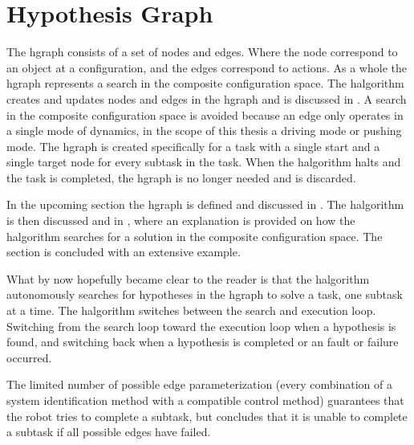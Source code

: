 \section{Hypothesis Graph}%
\label{sec:hgraph}
The \acf{hgraph} consists of a set of nodes and edges. Where the node correspond to an object at a configuration, and the edges correspond to actions. As a whole the \ac{hgraph} represents a search in the composite configuration space. The \ac{halgorithm} creates and updates nodes and edges in the \ac{hgraph} and is discussed in . A search in the composite configuration space is avoided because an edge only operates in a single mode of dynamics, in the scope of this thesis a driving mode or pushing mode. The \ac{hgraph} is created specifically for a task with a single start and a single target node for every subtask in the task. When the \ac{halgorithm} halts and the task is completed, the \ac{hgraph} is no longer needed and is discarded.\bs

In the upcoming section the \ac{hgraph} is defined and discussed in . The \ac{halgorithm} is then discussed and in , where an explanation is provided on how the \ac{halgorithm} searches for a solution in the composite configuration space. The section is concluded with an extensive example.\bs





What by now hopefully became clear to the reader is that the \ac{halgorithm} autonomously searches for hypotheses in the \ac{hgraph} to solve a task, one subtask at a time. The \ac{halgorithm} switches between the search and execution loop. Switching from the search loop toward the execution loop when a hypothesis is found, and switching back when a hypothesis is completed or an fault or failure occurred.\bs

The limited number of possible edge parameterization (every combination of a system identification method with a compatible control method) guarantees that the robot tries to complete a subtask, but concludes that it is unable to complete a subtask if all possible edges have failed.\bs

